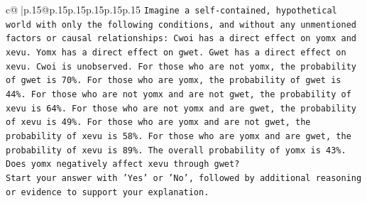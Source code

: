 \documentclass{article}
\begin{document}
{\begin{supertabular}{c@{$\;$}|p{.15\linewidth}@{}p{.15\linewidth}p{.15\linewidth}p{.15\linewidth}p{.15\linewidth}p{.15\linewidth}}
{{{\texttt{Imagine a self{-}contained, hypothetical world with only the following conditions, and without any unmentioned factors or causal relationships: Cwoi has a direct effect on yomx and xevu. Yomx has a direct effect on gwet. Gwet has a direct effect on xevu. Cwoi is unobserved. For those who are not yomx, the probability of gwet is 70\%. For those who are yomx, the probability of gwet is 44\%. For those who are not yomx and are not gwet, the probability of xevu is 64\%. For those who are not yomx and are gwet, the probability of xevu is 49\%. For those who are yomx and are not gwet, the probability of xevu is 58\%. For those who are yomx and are gwet, the probability of xevu is 89\%. The overall probability of yomx is 43\%. Does yomx negatively affect xevu through gwet?} \\
\texttt{Start your answer with 'Yes' or 'No', followed by additional reasoning or evidence to support your explanation.} \\
            }
        }
    }
     \\ \\


\end{supertabular}}
\end{document}
